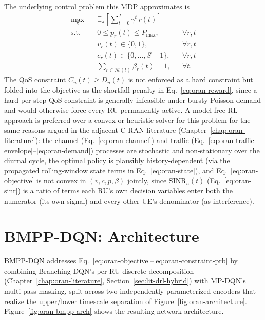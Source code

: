 The underlying control problem this MDP approximates is
\begin{align}
  \max_{\pi}\quad & \mathbb{E}_\pi\!\left[\sum_{t=0}^{T} \gamma^t\, r(t)\right] \label{eq:oran-objective}\\
  \text{s.t.}\quad & 0 \leq p_r(t) \leq P_{\max}, && \forall r, t \label{eq:oran-constraint-power}\\
  & v_r(t) \in \{0,1\}, && \forall r, t \label{eq:oran-constraint-binary}\\
  & c_r(t) \in \{0,\dots,S-1\}, && \forall r, t \label{eq:oran-constraint-split}\\
  & \textstyle\sum_{r \in \mathcal{M}(t)} \beta_r(t) = 1, && \forall t. \label{eq:oran-constraint-prb}
\end{align}
The QoS constraint $C_u(t) \geq D_u(t)$ is not enforced as a hard
constraint but folded into the objective as the shortfall penalty in
Eq.~\ref{eq:oran-reward}, since a hard per-step QoS constraint is
generally infeasible under bursty Poisson demand and would otherwise force
every RU permanently active. A model-free RL approach is preferred over a
convex or heuristic solver for this problem for the same reasons argued in
the adjacent C-RAN literature (Chapter~\ref{chap:oran-literature}): the
channel (Eq.~\ref{eq:oran-channel}) and traffic
(Eq.~\ref{eq:oran-traffic-envelope}--\ref{eq:oran-demand}) processes are
stochastic and non-stationary over the diurnal cycle, the optimal policy
is plausibly history-dependent (via the propagated rolling-window state
terms in Eq.~\ref{eq:oran-state}), and Eq.~\ref{eq:oran-objective} is not
convex in $(v, c, p, \beta)$ jointly, since $\mathrm{SINR}_u(t)$
(Eq.~\ref{eq:oran-sinr}) is a ratio of terms each RU's own decision
variables enter both the numerator (its own signal) and every other UE's
denominator (as interference).

\section{BMPP-DQN: Architecture}
\label{sec:oran-bmpp-architecture}

BMPP-DQN addresses Eq.~\ref{eq:oran-objective}--\ref{eq:oran-constraint-prb}
by combining Branching DQN's per-RU discrete decomposition
(Chapter~\ref{chap:oran-literature}, Section~\ref{sec:lit-drl-hybrid}) with
MP-DQN's multi-pass masking, split across two independently-parameterized
encoders that realize the upper/lower timescale separation of
Figure~\ref{fig:oran-architecture}. Figure~\ref{fig:oran-bmpp-arch} shows
the resulting network architecture.

